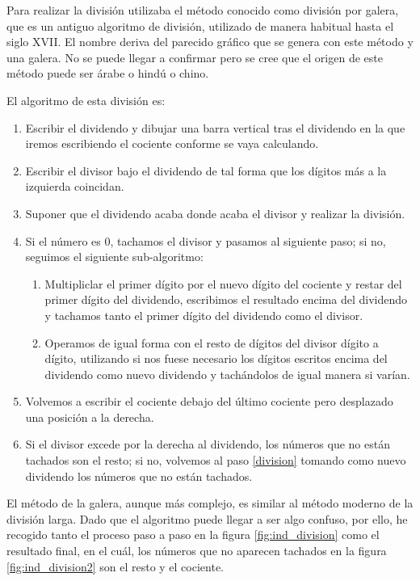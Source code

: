 \documentclass[a4paper, 11pt]{article}
\begin{document}
		Para realizar la división utilizaba el método conocido como división por galera, que es un antiguo algoritmo de
		división, utilizado de manera habitual hasta el siglo XVII. El nombre deriva del parecido gráfico que se genera
		con este método y una galera. No se puede llegar a confirmar pero se cree que el origen de este método puede ser
		árabe o hindú o chino.
		
		El algoritmo de esta división es:
		\begin{enumerate}
			\item Escribir el dividendo y dibujar una barra vertical tras el dividendo en la que iremos escribiendo el
			cociente conforme se vaya calculando.
			\item Escribir el divisor bajo el dividendo de tal forma que los dígitos más a la izquierda coincidan.
			\item Suponer que el dividendo acaba donde acaba el divisor y realizar la división.\label{division}
			\item Si el número es 0, tachamos el divisor y pasamos al siguiente paso; si no, seguimos el siguiente
			sub-algoritmo:
			\begin{enumerate}
				\item Multipliclar el primer dígito por el nuevo dígito del cociente y restar del primer dígito del
				dividendo, escribimos el resultado encima del dividendo y tachamos tanto el primer dígito del
				dividendo como el divisor.
				\item Operamos de igual forma con el resto de dígitos del divisor dígito a dígito, utilizando si nos
				fuese necesario los dígitos escritos encima del dividendo como nuevo dividendo y tachándolos de igual
				manera si varían.
			\end{enumerate}
			\item Volvemos a escribir el cociente debajo del último cociente pero desplazado una posición a la derecha.
			\item Si el divisor excede por la derecha al dividendo, los números que no están tachados son el resto; si
			no, volvemos al paso \ref{division} tomando como nuevo dividendo los números que no están tachados.
		\end{enumerate}
		
		El método de la galera, aunque más complejo, es similar al método moderno de la división larga. Dado que el
		algoritmo puede llegar a ser algo confuso, por ello, he recogido tanto el proceso paso a paso en la figura
		\ref{fig:ind_division} como el resultado final, en el cuál, los números que no aparecen tachados en la figura
		\ref{fig:ind_division2} son el resto y el cociente.
\end{document}
